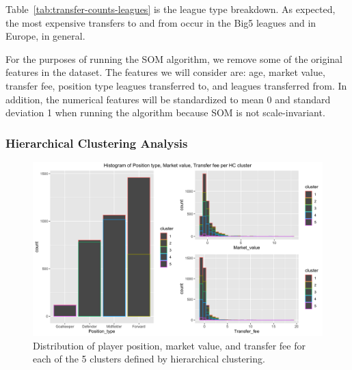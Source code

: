 Table~\ref{tab:transfer-counts-leagues} is the league type breakdown. 
As expected, the most expensive transfers to and from occur in the Big5 leagues 
and in Europe, in general.

For the purposes of running the SOM algorithm, 
we remove some of the original features in the dataset. 
The features we will consider are:
age, market value, transfer fee, position type
leagues transferred to, and leagues transferred from.
In addition, the numerical features will be standardized to mean 0 and standard deviation 1 
when running the algorithm because SOM is not scale-invariant.

\subsubsection{Hierarchical Clustering Analysis}\label{sssec:transfer-hc}

\begin{figure}[t]
    \centering
    \includegraphics[width=\textwidth]{../figs/transfer_hc_ppmvtf.png}
    \caption{Distribution of player position, 
             market value, and transfer fee for 
             each of the 5 clusters defined by hierarchical clustering.}
    \label{fig:hc-ppmvtf}
\end{figure}

